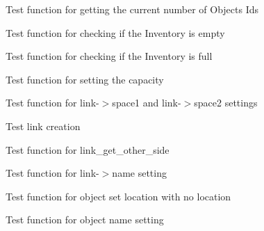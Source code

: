 \begin{DoxyRefList}
\item[\label{test__test000110}%
\hypertarget{test__test000110}{}%
Member \hyperlink{inventory__test_8h_adc6cd2ad429ac85285e5f40619c2e06b}{test3\+\_\+inventory\+\_\+get\+\_\+objects\+\_\+number} ()]Test function for getting the current number of Objects Ids  
\item[\label{test__test000119}%
\hypertarget{test__test000119}{}%
Member \hyperlink{inventory__test_8h_a9c8daeb141dbec6ddd5621edade53091}{test3\+\_\+inventory\+\_\+is\+\_\+empty} ()]Test function for checking if the Inventory is empty  
\item[\label{test__test000122}%
\hypertarget{test__test000122}{}%
Member \hyperlink{inventory__test_8h_a540dbcbfd29bd63590d081e496f8227f}{test3\+\_\+inventory\+\_\+is\+\_\+full} ()]Test function for checking if the Inventory is full  
\item[\label{test__test000103}%
\hypertarget{test__test000103}{}%
Member \hyperlink{inventory__test_8h_a270c2d6aecda0d73fbcff6ca0c9a90db}{test3\+\_\+inventory\+\_\+set\+\_\+max\+\_\+objects} ()]Test function for setting the capacity  
\item[\label{test__test000132}%
\hypertarget{test__test000132}{}%
Member \hyperlink{link__test_8h_a1fdabc1833331e2d0c3ab3e420db4a0c}{test3\+\_\+link\+\_\+add\+\_\+space} ()]Test function for link-\/$>$space1 and link-\/$>$space2 settings  
\item[\label{test__test000125}%
\hypertarget{test__test000125}{}%
Member \hyperlink{link__test_8h_a8064d57d2dea4a7554fa1b29ad8eca8a}{test3\+\_\+link\+\_\+create} ()]Test link creation  
\item[\label{test__test000143}%
\hypertarget{test__test000143}{}%
Member \hyperlink{link__test_8h_a624e83e69b76d04ac199a51741a392f5}{test3\+\_\+link\+\_\+get\+\_\+other\+\_\+side} ()]Test function for link\+\_\+get\+\_\+other\+\_\+side  
\item[\label{test__test000129}%
\hypertarget{test__test000129}{}%
Member \hyperlink{link__test_8h_a8396e33f601deb52c940cb89cd7c6bfe}{test3\+\_\+link\+\_\+set\+\_\+name} ()]Test function for link-\/$>$name setting  
\item[\label{test__test000153}%
\hypertarget{test__test000153}{}%
Member \hyperlink{object__test_8h_a4c8afcd65be7fa10be6597b68c38056e}{test3\+\_\+object\+\_\+set\+\_\+location} ()]Test function for object set location with no location  
\item[\label{test__test000150}%
\hypertarget{test__test000150}{}%
Member \hyperlink{object__test_8h_ab40669b5d083b6484197d917fb6882b1}{test3\+\_\+object\+\_\+set\+\_\+name} ()]Test function for object name setting  

\end{DoxyRefList}

